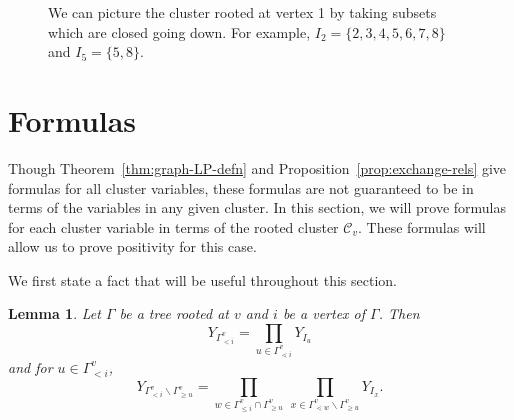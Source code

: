 \documentclass[pdftex]{sigma}
\numberwithin{equation}{section}
\newtheorem{Lemma}[Theorem]{Lemma}
\newcommand{\calC}{\mathcal{C}}
\begin{document}
\begin{figure}
\begin{center}
\end{center}
\caption{We can picture the cluster rooted at vertex 1 by taking subsets which are closed going down. For example, $I_2 = \{2,3,4,5,6,7,8\}$ and $I_5 = \{5,8\}$.}\label{fig:exampletree}
\end{figure}

\section{Formulas}\label{sec:formulas}

Though Theorem~\ref{thm:graph-LP-defn} and Proposition~\ref{prop:exchange-rels} give formulas for all cluster variables, these formulas are not guaranteed to be in terms of the variables in any given cluster. In this section, we will prove formulas for each cluster variable in terms of the rooted cluster $\calC_v$. These formulas will allow us to prove positivity for this case.

We first state a fact that will be useful throughout this section.

\begin{Lemma}
\label{lem:in-cluster}
Let $\Gamma$ be a tree rooted at $v$ and $i$ be a vertex of $\Gamma$. Then \[Y_{\Gamma_{< i}^v}=\prod_{u\in\Gamma_{\lessdot i}^v}Y_{I_u}\]
and for $u\in\Gamma_{< i}^v$,
\[ Y_{\Gamma_{< i}^v \backslash \Gamma_{\geq u}^v} = \prod_{w \in \Gamma_{\leq i}^v \cap \Gamma_{\geq u}^{v}} ~\prod_{x \in \Gamma_{\lessdot w}^{v} \backslash \Gamma_{\geq u}^{v}} Y_{I_{x}}. \]
\end{Lemma}
\end{document}
